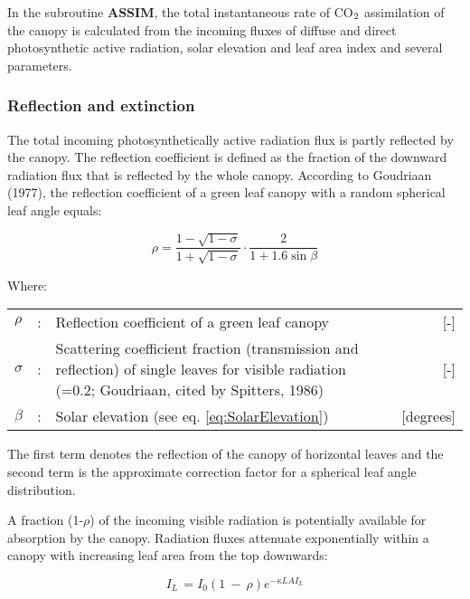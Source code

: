 In the subroutine {\bf ASSIM}, the total instantaneous rate of CO$_{{\rm 2}}$ assimilation of the canopy is
calculated from the incoming fluxes of diffuse and direct photosynthetic active radiation,
solar elevation and leaf area index and several parameters.

\subsubsection{Reflection and extinction}
The total incoming photosynthetically active radiation flux is partly reflected by the
canopy. The reflection coefficient is defined as the fraction of the downward radiation
flux that is reflected by the whole canopy. According to Goudriaan (1977), the reflection
coefficient of a green leaf canopy with a random spherical leaf angle equals:

\begin{equation}
\label{eq:5.12}
\rho = {\frac{1- \sqrt{1-\sigma}}{1 + \sqrt{1-\sigma}}} \cdot {\frac{2}{1+1.6 \sin \beta }}
\end{equation}

Where:\\[5pt]
\begin{tabularx}{\textwidth}{llXr}
$\rho$ &:& Reflection coefficient of a green leaf canopy    &    [-]\\
$\sigma$ &:& Scattering coefficient fraction (transmission and reflection) 
   of single leaves for visible radiation   
   {\small (=0.2; Goudriaan, cited by Spitters, 1986)}  &     [-]\\  
$\beta$ &:& Solar elevation (see eq. \ref{eq:SolarElevation})    &    [degrees]\\
\end{tabularx}
 
The first term denotes the reflection of the canopy of horizontal leaves and the second
term is the approximate correction factor for a spherical leaf angle distribution.

A fraction (1-$\rho$) of the incoming visible radiation is potentially available for absorption by
the canopy. Radiation fluxes attenuate exponentially within a canopy with increasing leaf
area from the top downwards:

\begin{equation}
\label{eq:5.13}
I_{L~} = I_{0} (1~-~\rho ) e^{-\kappa LAI_{L} }
\end{equation}

